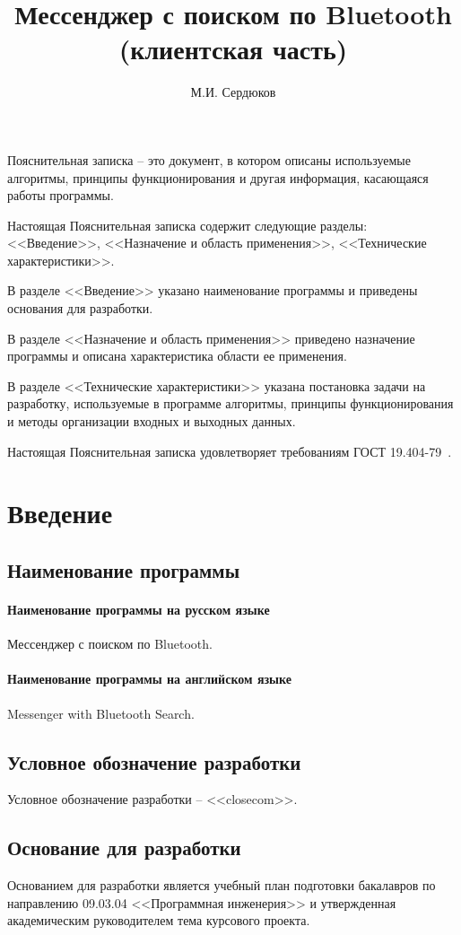 \documentclass[explnote]{espd}
\author{М.И. Сердюков}
\title{Мессенджер с поиском по Bluetooth\\(клиентская часть)}
\begin{document}
\annotation
Пояснительная записка -- это документ, в котором описаны используемые алгоритмы, принципы функционирования и другая информация, касающаяся работы программы.

Настоящая Пояснительная записка содержит следующие разделы: <<Введение>>, <<Назначение и область применения>>, <<Технические характеристики>>.

В разделе <<Введение>> указано наименование программы и приведены основания для разработки.

В разделе <<Назначение и область применения>> приведено назначение программы и описана характеристика области ее применения.

В разделе <<Технические характеристики>> указана постановка задачи на разработку, используемые в программе алгоритмы, принципы функционирования и методы организации входных и выходных данных.

Настоящая Пояснительная записка удовлетворяет требованиям ГОСТ 19.404-79~\cite{espd404}.

\tableofcontents

\section{Введение}
\subsection{Наименование программы}
\paragraph{Наименование программы на русском языке}
Мессенджер с поиском по Bluetooth.
\paragraph{Наименование программы на английском языке}
Messenger with Bluetooth Search.

\subsection{Условное обозначение разработки}
Условное обозначение разработки -- <<closecom>>.

\subsection{Основание для разработки}
Основанием для разработки является учебный план подготовки бакалавров по направлению 09.03.04 <<Программная инженерия>> и утвержденная академическим руководителем тема курсового проекта.
\end{document}

